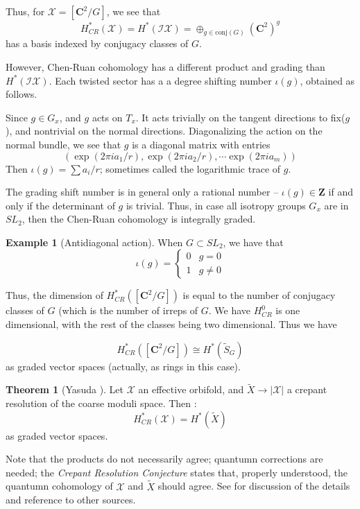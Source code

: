 \documentclass{amsart}[12pt]
\theoremstyle{definition}
\newtheorem{theorem}[dummy]{Theorem}
\newtheorem{example}[dummy]{Example}
\newcommand{\Z}{\mathbf{Z}}
\newcommand{\C}{\mathbf{C}}
\begin{document}
Thus, for $\mathcal{X}=[\C^2/G]$, we see that 
$$H_{CR}^*(\mathcal{X}) =H^*(\mathcal{IX})=\oplus_{g\in\textrm{conj}(G)} (\C^2)^g$$
has a basis indexed by conjugacy classes of $G$.

However, Chen-Ruan cohomology has a different product and grading than $H^*(\mathcal{IX})$.  Each twisted sector has a a degree shifting number $\iota(g)$, obtained as follows.

Since $g\in G_x$, and $g$ acts on $T_x$.  It acts trivially on the tangent directions to fix($g$), and nontrivial on the normal directions.  Diagonalizing the action on the normal bundle, we see that $g$ is a diagonal matrix with entries 
$$(\exp(2\pi i a_1/r), \exp(2\pi i a_2/r), \cdots \exp(2\pi i a_m))$$
Then $\iota(g)=\sum a_i/r$; sometimes called the logarithmic trace of $g$.

The grading shift number is in general only a rational number -- $\iota(g)\in \Z$ if and only if the determinant of $g$ is trivial.  Thus, in case all isotropy groups $G_x$ are in $SL_2$, then the Chen-Ruan cohomology is integrally graded.

\begin{example}[Antidiagonal action]
When $G\subset SL_2$, we have that 
$$\iota(g)=\left\{\begin{array}{rl} 0 & g=0 \\
1 & g\neq 0 \end{array}\right.
$$

Thus, the dimension of $H_{CR}^*([\C^2/G])$ is equal to the number of conjugacy classes of $G$ (which is the number of irreps of $G$.  We have $H_{CR}^0$ is one dimensional, with the rest of the classes being two dimensional.  Thus we have

$$H_{CR}^*([\C^2/G])\cong H^*(\widetilde{S}_G)$$
as graded vector spaces (actually, as rings in this case).  
\end{example}


\begin{theorem}[Yasuda \cite{yasuda}] \label{thm:yasuda}
Let $\mathcal{X}$ an effective orbifold, and $\widetilde{X}\to|\mathcal{X}|$ a crepant resolution of the coarse moduli space.  Then :
$$H_{CR}^*(\mathcal{X})=H^*(\widetilde{X})$$
as graded vector spaces.  
\end{theorem}

Note that the products do not necessarily agree; quantumn corrections are needed; the \emph{Crepant Resolution Conjecture} states that, properly understood, the quantumn cohomology of $\mathcal{X}$ and $\widetilde{X}$ should agree.  See \cite{CoatesRuan} for discussion of the details and reference to other sources.
\end{document}
